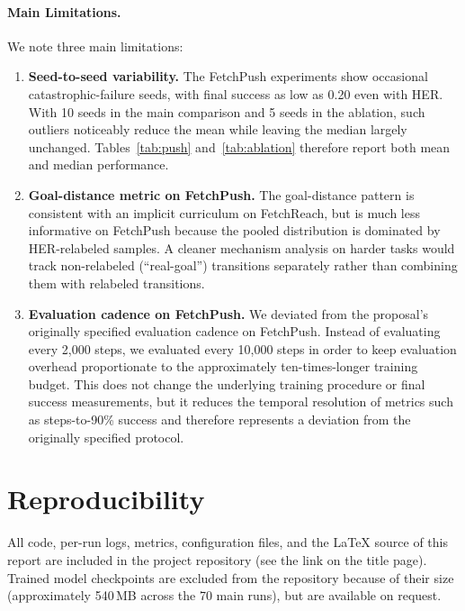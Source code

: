 \documentclass{article}
\begin{document}
\paragraph{Main Limitations.}
We note three main limitations:

\begin{enumerate}
    \item \textbf{Seed-to-seed variability.}
    The FetchPush experiments show occasional catastrophic-failure seeds, with
    final success as low as 0.20 even with HER. With 10 seeds in the main
    comparison and 5 seeds in the ablation, such outliers noticeably reduce the
    mean while leaving the median largely unchanged. Tables~\ref{tab:push}
    and~\ref{tab:ablation} therefore report both mean and median performance.

    \item \textbf{Goal-distance metric on FetchPush.}
    The goal-distance pattern is consistent with an implicit curriculum on
    FetchReach, but is much less informative on FetchPush because the pooled
    distribution is dominated by HER-relabeled samples. A cleaner mechanism
    analysis on harder tasks would track non-relabeled (``real-goal'')
    transitions separately rather than combining them with relabeled transitions.

    \item \textbf{Evaluation cadence on FetchPush.}
    We deviated from the proposal's originally specified evaluation cadence on
    FetchPush. Instead of evaluating every 2,000 steps, we evaluated every
    10,000 steps in order to keep evaluation overhead proportionate to the
    approximately ten-times-longer training budget. This does not change the
    underlying training procedure or final success measurements, but it reduces
    the temporal resolution of metrics such as steps-to-90\% success and therefore
    represents a deviation from the originally specified protocol.
\end{enumerate}

\section{Reproducibility}
\label{sec:repro}
All code, per-run logs, metrics, configuration files, and the LaTeX source of
this report are included in the project repository (see the link on the title
page). Trained model checkpoints are excluded from the repository because of
their size (approximately 540\,MB across the 70 main runs), but are available
on request.
\end{document}
